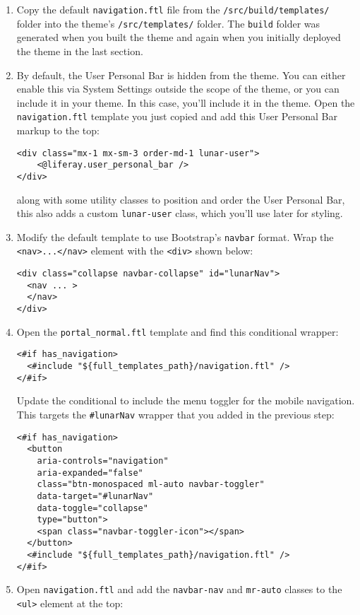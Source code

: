 \begin{enumerate}
\def\labelenumi{\arabic{enumi}.}
\item
  Copy the default \texttt{navigation.ftl} file from the
  \texttt{/src/build/templates/} folder into the theme's
  \texttt{/src/templates/} folder. The \texttt{build} folder was
  generated when you built the theme and again when you initially
  deployed the theme in the last section.
\item
  By default, the User Personal Bar is hidden from the theme. You can
  either enable this via System Settings outside the scope of the theme,
  or you can include it in your theme. In this case, you'll include it
  in the theme. Open the \texttt{navigation.ftl} template you just
  copied and add this User Personal Bar markup to the top:

\begin{verbatim}
<div class="mx-1 mx-sm-3 order-md-1 lunar-user">
    <@liferay.user_personal_bar />
</div>
\end{verbatim}

  along with some utility classes to position and order the User
  Personal Bar, this also adds a custom \texttt{lunar-user} class, which
  you'll use later for styling.
\item
  Modify the default template to use Bootstrap's \texttt{navbar} format.
  Wrap the
  \texttt{\textless{}nav\textgreater{}...\textless{}/nav\textgreater{}}
  element with the \texttt{\textless{}div\textgreater{}} shown below:

\begin{verbatim}
<div class="collapse navbar-collapse" id="lunarNav">
  <nav ... >
  </nav>
</div>
\end{verbatim}
\item
  Open the \texttt{portal\_normal.ftl} template and find this
  conditional wrapper:

\begin{verbatim}
<#if has_navigation>
  <#include "${full_templates_path}/navigation.ftl" />
</#if>
\end{verbatim}

  Update the conditional to include the menu toggler for the mobile
  navigation. This targets the \texttt{\#lunarNav} wrapper that you
  added in the previous step:

\begin{verbatim}
<#if has_navigation>
  <button 
    aria-controls="navigation" 
    aria-expanded="false" 
    class="btn-monospaced ml-auto navbar-toggler" 
    data-target="#lunarNav" 
    data-toggle="collapse" 
    type="button">
    <span class="navbar-toggler-icon"></span>
  </button>
  <#include "${full_templates_path}/navigation.ftl" />
</#if>
\end{verbatim}
\item
  Open \texttt{navigation.ftl} and add the \texttt{navbar-nav} and
  \texttt{mr-auto} classes to the \texttt{\textless{}ul\textgreater{}}
  element at the top:


\end{enumerate}
